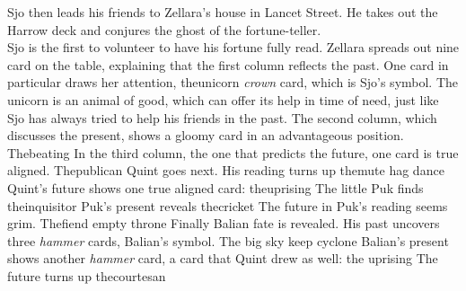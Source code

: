 Sjo then leads his friends to Zellara's house in Lancet Street. He takes out the Harrow deck and conjures the ghost of the fortune-teller.\\

Sjo is the first to volunteer to have his fortune fully read. Zellara spreads out nine card on the table, explaining that the first column reflects the past. One card in particular draws her attention, theunicorn  {\itshape crown} card, which is Sjo's symbol. The unicorn is an animal of good, which can offer its help in time of need, just like Sjo has always tried to help his friends in the past. The second column, which discusses the present, shows a gloomy card in an advantageous position. Thebeating In the third column, the one that predicts the future, one card is true aligned. Thepublican Quint goes next. His reading turns up themute hag dance Quint's future shows one true aligned card: theuprising The little Puk finds theinquisitor Puk's present reveals thecricket The future in Puk's reading seems grim. Thefiend empty throne Finally Balian fate is revealed. His past uncovers three {\itshape hammer} cards, Balian's symbol. The big sky keep cyclone Balian's present shows another {\itshape hammer} card, a card that Quint drew as well: the uprising The future turns up thecourtesan 